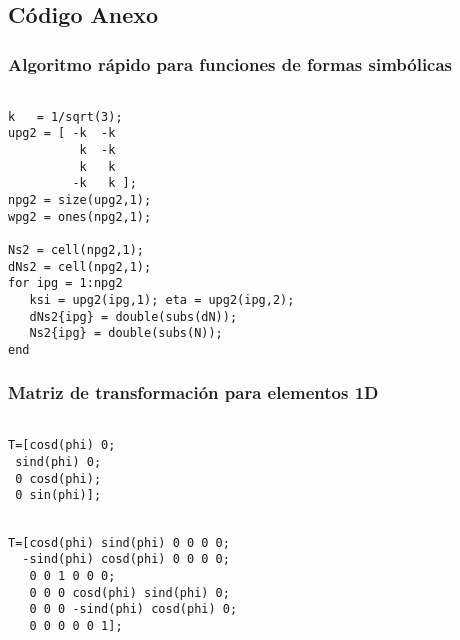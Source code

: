  \clearpage
 \subsection*{Código \Matlab{} Anexo}
    \subsubsection*{Algoritmo rápido para funciones de formas simbólicas}

\begin{code}
	\begin{verbatim} 

k   = 1/sqrt(3);
upg2 = [ -k  -k
          k  -k
          k   k
         -k   k ];
npg2 = size(upg2,1);
wpg2 = ones(npg2,1);

Ns2 = cell(npg2,1);
dNs2 = cell(npg2,1);
for ipg = 1:npg2
   ksi = upg2(ipg,1); eta = upg2(ipg,2);
   dNs2{ipg} = double(subs(dN)); 
   Ns2{ipg} = double(subs(N));
end
	\end{verbatim}
\end{code}

\subsubsection{Matriz de transformación para elementos 1D}
\begin{code}
	\begin{verbatim}
	
T=[cosd(phi) 0;
 sind(phi) 0;
 0 cosd(phi);
 0 sin(phi)];
	\end{verbatim}
\end{code}

\begin{code}
	\begin{verbatim}

T=[cosd(phi) sind(phi) 0 0 0 0;
  -sind(phi) cosd(phi) 0 0 0 0;
   0 0 1 0 0 0;
   0 0 0 cosd(phi) sind(phi) 0;
   0 0 0 -sind(phi) cosd(phi) 0;
   0 0 0 0 0 1];
	\end{verbatim}
\end{code}


